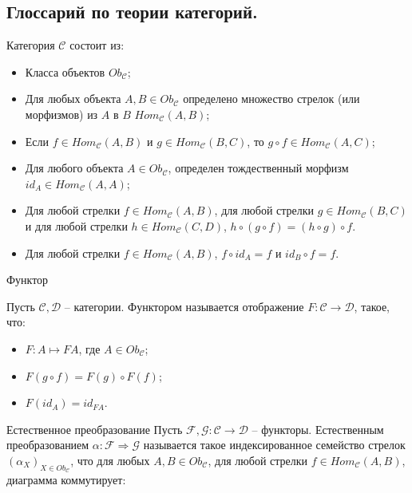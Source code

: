 \subsection{Глоссарий по теории категорий.}

\begin{defin}

  Категория $\mathcal{C}$ состоит из:
  \begin{itemize}
    \item Класса объектов $Ob_{\mathcal{C}}$;
    \item Для любых объекта $A, B \in Ob_{\mathcal{C}}$ определено множество стрелок (или морфизмов) из $A$ в $B$ $Hom_{\mathcal{C}}(A, B)$;
    \item Если $f \in Hom_{\mathcal{C}}(A, B)$ и $g \in Hom_{\mathcal{C}}(B,C)$, то $g \circ f \in Hom_{\mathcal{C}}(A, C)$;
    \item Для любого объекта $A \in Ob_{\mathcal{C}}$, определен тождественный морфизм $id_A \in Hom_{\mathcal{C}}(A, A)$;
    \item Для любой стрелки $f \in Hom_{\mathcal{C}}(A, B)$, для любой стрелки $g \in Hom_{\mathcal{C}}(B,C)$ и для любой стрелки $h \in Hom_{\mathcal{C}}(C,D)$, $h \circ (g \circ f) = (h \circ g) \circ f$.
    \item Для любой стрелки $f \in Hom_{\mathcal{C}}(A, B)$, $f \circ id_A = f$ и $id_B \circ f = f$.
  \end{itemize}
\end{defin}


\begin{defin} Функтор

  Пусть $\mathcal{C}, \mathcal{D}$ -- категории. Функтором называется отображение $F : \mathcal{C} \to \mathcal{D}$, такое, что:
  \begin{itemize}
    \item $F : A \mapsto F A$, где $A \in Ob_{\mathcal{C}}$;
    \item $F (g \circ f) = F(g) \circ F(f)$;
    \item $F (id_A) = id_{F A}$.
  \end{itemize}
\end{defin}

\begin{defin} Естественное преобразование
  Пусть $\mathcal{F}, \mathcal{G} : \mathcal{C} \to \mathcal{D}$ -- функторы.
  Естественным преобразованием $\alpha : \mathcal{F} \Rightarrow \mathcal{G}$ называется такое индексированное семейство стрелок $(\alpha_{X})_{X \in Ob_{\mathcal{C}}}$,
что для любых $A, B \in Ob_{\mathcal{C}}$, для любой стрелки $f \in Hom_{\mathcal{C}}(A, B)$, диаграмма коммутирует:

\end{defin}


